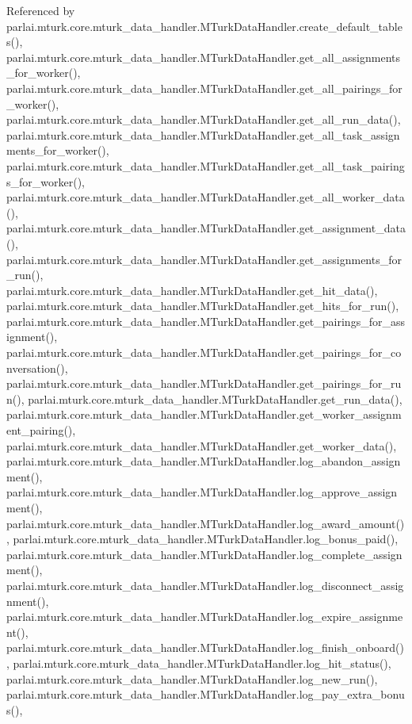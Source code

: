 Referenced by parlai.\+mturk.\+core.\+mturk\+\_\+data\+\_\+handler.\+M\+Turk\+Data\+Handler.\+create\+\_\+default\+\_\+tables(), parlai.\+mturk.\+core.\+mturk\+\_\+data\+\_\+handler.\+M\+Turk\+Data\+Handler.\+get\+\_\+all\+\_\+assignments\+\_\+for\+\_\+worker(), parlai.\+mturk.\+core.\+mturk\+\_\+data\+\_\+handler.\+M\+Turk\+Data\+Handler.\+get\+\_\+all\+\_\+pairings\+\_\+for\+\_\+worker(), parlai.\+mturk.\+core.\+mturk\+\_\+data\+\_\+handler.\+M\+Turk\+Data\+Handler.\+get\+\_\+all\+\_\+run\+\_\+data(), parlai.\+mturk.\+core.\+mturk\+\_\+data\+\_\+handler.\+M\+Turk\+Data\+Handler.\+get\+\_\+all\+\_\+task\+\_\+assignments\+\_\+for\+\_\+worker(), parlai.\+mturk.\+core.\+mturk\+\_\+data\+\_\+handler.\+M\+Turk\+Data\+Handler.\+get\+\_\+all\+\_\+task\+\_\+pairings\+\_\+for\+\_\+worker(), parlai.\+mturk.\+core.\+mturk\+\_\+data\+\_\+handler.\+M\+Turk\+Data\+Handler.\+get\+\_\+all\+\_\+worker\+\_\+data(), parlai.\+mturk.\+core.\+mturk\+\_\+data\+\_\+handler.\+M\+Turk\+Data\+Handler.\+get\+\_\+assignment\+\_\+data(), parlai.\+mturk.\+core.\+mturk\+\_\+data\+\_\+handler.\+M\+Turk\+Data\+Handler.\+get\+\_\+assignments\+\_\+for\+\_\+run(), parlai.\+mturk.\+core.\+mturk\+\_\+data\+\_\+handler.\+M\+Turk\+Data\+Handler.\+get\+\_\+hit\+\_\+data(), parlai.\+mturk.\+core.\+mturk\+\_\+data\+\_\+handler.\+M\+Turk\+Data\+Handler.\+get\+\_\+hits\+\_\+for\+\_\+run(), parlai.\+mturk.\+core.\+mturk\+\_\+data\+\_\+handler.\+M\+Turk\+Data\+Handler.\+get\+\_\+pairings\+\_\+for\+\_\+assignment(), parlai.\+mturk.\+core.\+mturk\+\_\+data\+\_\+handler.\+M\+Turk\+Data\+Handler.\+get\+\_\+pairings\+\_\+for\+\_\+conversation(), parlai.\+mturk.\+core.\+mturk\+\_\+data\+\_\+handler.\+M\+Turk\+Data\+Handler.\+get\+\_\+pairings\+\_\+for\+\_\+run(), parlai.\+mturk.\+core.\+mturk\+\_\+data\+\_\+handler.\+M\+Turk\+Data\+Handler.\+get\+\_\+run\+\_\+data(), parlai.\+mturk.\+core.\+mturk\+\_\+data\+\_\+handler.\+M\+Turk\+Data\+Handler.\+get\+\_\+worker\+\_\+assignment\+\_\+pairing(), parlai.\+mturk.\+core.\+mturk\+\_\+data\+\_\+handler.\+M\+Turk\+Data\+Handler.\+get\+\_\+worker\+\_\+data(), parlai.\+mturk.\+core.\+mturk\+\_\+data\+\_\+handler.\+M\+Turk\+Data\+Handler.\+log\+\_\+abandon\+\_\+assignment(), parlai.\+mturk.\+core.\+mturk\+\_\+data\+\_\+handler.\+M\+Turk\+Data\+Handler.\+log\+\_\+approve\+\_\+assignment(), parlai.\+mturk.\+core.\+mturk\+\_\+data\+\_\+handler.\+M\+Turk\+Data\+Handler.\+log\+\_\+award\+\_\+amount(), parlai.\+mturk.\+core.\+mturk\+\_\+data\+\_\+handler.\+M\+Turk\+Data\+Handler.\+log\+\_\+bonus\+\_\+paid(), parlai.\+mturk.\+core.\+mturk\+\_\+data\+\_\+handler.\+M\+Turk\+Data\+Handler.\+log\+\_\+complete\+\_\+assignment(), parlai.\+mturk.\+core.\+mturk\+\_\+data\+\_\+handler.\+M\+Turk\+Data\+Handler.\+log\+\_\+disconnect\+\_\+assignment(), parlai.\+mturk.\+core.\+mturk\+\_\+data\+\_\+handler.\+M\+Turk\+Data\+Handler.\+log\+\_\+expire\+\_\+assignment(), parlai.\+mturk.\+core.\+mturk\+\_\+data\+\_\+handler.\+M\+Turk\+Data\+Handler.\+log\+\_\+finish\+\_\+onboard(), parlai.\+mturk.\+core.\+mturk\+\_\+data\+\_\+handler.\+M\+Turk\+Data\+Handler.\+log\+\_\+hit\+\_\+status(), parlai.\+mturk.\+core.\+mturk\+\_\+data\+\_\+handler.\+M\+Turk\+Data\+Handler.\+log\+\_\+new\+\_\+run(), parlai.\+mturk.\+core.\+mturk\+\_\+data\+\_\+handler.\+M\+Turk\+Data\+Handler.\+log\+\_\+pay\+\_\+extra\+\_\+bonus(), 
